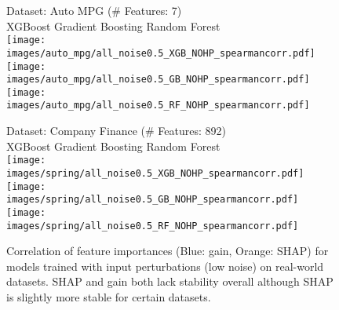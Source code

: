 \begin{figure*}[h]
  Dataset: Auto MPG (\# Features: 7)\\
    XGBoost \hspace{1.7cm} Gradient Boosting \hspace{1cm} Random Forest \\
  
  \texttt{[image: images/auto\_mpg/all\_noise0.5\_XGB\_NOHP\_spearmancorr.pdf]}
  \texttt{[image: images/auto\_mpg/all\_noise0.5\_GB\_NOHP\_spearmancorr.pdf]}
  \texttt{[image: images/auto\_mpg/all\_noise0.5\_RF\_NOHP\_spearmancorr.pdf]}
  
  Dataset: Company Finance (\# Features: 892)\\
     XGBoost \hspace{1.7cm} Gradient Boosting \hspace{1cm} Random Forest \\
  
  \texttt{[image: images/spring/all\_noise0.5\_XGB\_NOHP\_spearmancorr.pdf]}
  \texttt{[image: images/spring/all\_noise0.5\_GB\_NOHP\_spearmancorr.pdf]}
  \texttt{[image: images/spring/all\_noise0.5\_RF\_NOHP\_spearmancorr.pdf]}
  \caption{Correlation of feature importances (Blue: gain, Orange: SHAP) for models trained with input perturbations (low noise) on real-world datasets.  SHAP and gain both lack stability overall although SHAP is slightly more stable for certain datasets. }
\label{fig:real_world_noisy_inputs}
\end{figure*}

  
